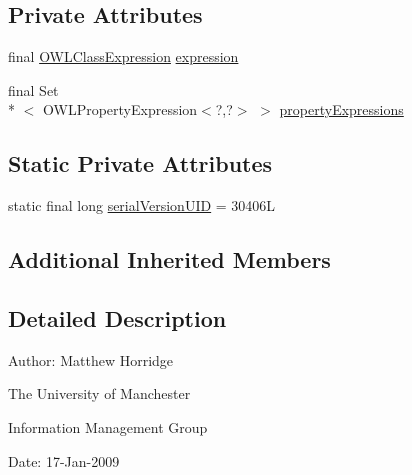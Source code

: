 \subsection*{Private Attributes}
\begin{DoxyCompactItemize}
\item 
final \hyperlink{interfaceorg_1_1semanticweb_1_1owlapi_1_1model_1_1_o_w_l_class_expression}{O\-W\-L\-Class\-Expression} \hyperlink{classuk_1_1ac_1_1manchester_1_1cs_1_1owl_1_1owlapi_1_1_o_w_l_has_key_axiom_impl_a355e5d0b0423e63ff9bb68f4e46c6c1a}{expression}
\item 
final Set\\*
$<$ O\-W\-L\-Property\-Expression$<$?,?$>$ $>$ \hyperlink{classuk_1_1ac_1_1manchester_1_1cs_1_1owl_1_1owlapi_1_1_o_w_l_has_key_axiom_impl_a296ff7ecb945f70f3c9cd48ae13bb0e3}{property\-Expressions}
\end{DoxyCompactItemize}
\subsection*{Static Private Attributes}
\begin{DoxyCompactItemize}
\item 
static final long \hyperlink{classuk_1_1ac_1_1manchester_1_1cs_1_1owl_1_1owlapi_1_1_o_w_l_has_key_axiom_impl_aa7b89a8b031f5c749fa541aae7bd14c3}{serial\-Version\-U\-I\-D} = 30406\-L
\end{DoxyCompactItemize}
\subsection*{Additional Inherited Members}


\subsection{Detailed Description}
Author\-: Matthew Horridge\par
 The University of Manchester\par
 Information Management Group\par
 Date\-: 17-\/\-Jan-\/2009 

